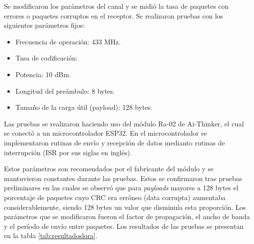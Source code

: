 Se modificaron los parámetros del canal y se midió la tasa de paquetes con errores o paquetes corruptos en el receptor. Se realizaron pruebas con los siguientes parámetros fijos:

\begin{itemize}
    \item Frecuencia de operación: 433 MHz.
    \item Tasa de codificación:
    \item Potencia: 10 dBm.
    \item Longitud del preámbulo: 8 bytes.
    \item Tamaño de la carga útil (payload): 128 bytes.
\end{itemize}

Las pruebas se realizaron haciendo uso del módulo Ra-02 de Ai-Thinker, el cual se conectó a un microcontrolador ESP32. En el microcontrolador se implementaron rutinas de envío y recepción de datos medianto rutinas de interrupción (ISR por sus siglas en inglés).

Estos parámetros son recomendados por el fabricante del módulo y se mantuvieron constantes durante las pruebas. Estos se confirmaron tras pruebas preliminares en las cuales se observó que para \textit{payloads} mayores a 128 bytes el porcentaje de paquetes cuyo CRC era erróneo (data corrupta) aumentaba considerablemente, siendo 128 bytes un valor que disminuía esta proporción. Los parámetros que se modificaron fueron el factor de propagación, el ancho de banda y el período de envío entre paquetes. Los resultados de las pruebas se presentan en la tabla \ref{tab:resultadoslora}.

\begin{table}[H]
    \centering
    \caption{Resultados de pruebas realizadas con módulo de comunicaciones Ra-02.}
    \label{tab:resultadoslora}
\end{table}

